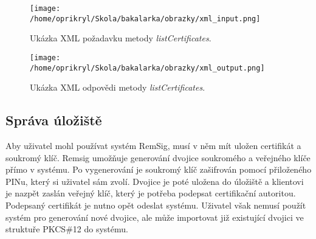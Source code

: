 \documentclass[]{fithesis3}
\begin{document}
		\begin{figure}[!ht]
  			\begin{minipage}{1.00\textwidth}
    			\texttt{[image: /home/oprikryl/Skola/bakalarka/obrazky/xml\_input.png]}
  			\end{minipage}
 			\caption{Ukázka XML požadavku metody \textit{listCertificates}.}
  			\label{fig:Ukázka XML požadavku.}
		\end{figure}

		\begin{figure}[!ht]
  			\begin{minipage}{1.00\textwidth}
    			\texttt{[image: /home/oprikryl/Skola/bakalarka/obrazky/xml\_output.png]}
  			\end{minipage}
 			\caption{Ukázka XML odpovědi metody \textit{listCertificates}.}
  			\label{fig:Ukázka XML odpovědi.}
		\end{figure}

	\subsection{Správa úložiště}
	
	Aby uživatel mohl používat systém RemSig, musí v něm mít uložen certifikát a soukromý klíč. 		Remsig umožňuje generování dvojice soukromého a veřejného klíče přímo v systému. Po 			vygenerování je soukromý klíč zašifrován pomocí přiloženého PINu, který si uživatel sám zvolí. 		Dvojice je poté uložena do úložiště a klientovi je nazpět zaslán veřejný klíč, který je potřeba 		podepsat certifikační autoritou. Podepsaný certifikát je nutno opět odeslat systému. Uživatel 		však nemusí použít systém pro generování nové dvojice, ale může importovat již existující 			dvojici ve struktuře PKCS\#12 do systému.
\end{document}

